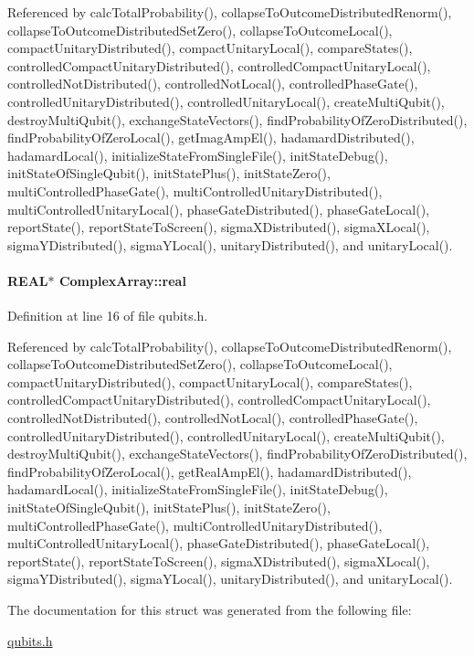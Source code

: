 Referenced by calcTotalProbability(), collapseToOutcomeDistributedRenorm(), collapseToOutcomeDistributedSetZero(), collapseToOutcomeLocal(), compactUnitaryDistributed(), compactUnitaryLocal(), compareStates(), controlledCompactUnitaryDistributed(), controlledCompactUnitaryLocal(), controlledNotDistributed(), controlledNotLocal(), controlledPhaseGate(), controlledUnitaryDistributed(), controlledUnitaryLocal(), createMultiQubit(), destroyMultiQubit(), exchangeStateVectors(), findProbabilityOfZeroDistributed(), findProbabilityOfZeroLocal(), getImagAmpEl(), hadamardDistributed(), hadamardLocal(), initializeStateFromSingleFile(), initStateDebug(), initStateOfSingleQubit(), initStatePlus(), initStateZero(), multiControlledPhaseGate(), multiControlledUnitaryDistributed(), multiControlledUnitaryLocal(), phaseGateDistributed(), phaseGateLocal(), reportState(), reportStateToScreen(), sigmaXDistributed(), sigmaXLocal(), sigmaYDistributed(), sigmaYLocal(), unitaryDistributed(), and unitaryLocal().\hypertarget{structComplexArray_a4195cac6c784ea1b6271f1c7dba1548a}{
\paragraph[{real}]{\setlength{\rightskip}{0pt plus 5cm}REAL$\ast$ {\bf ComplexArray::real}}\hfill}
\label{structComplexArray_a4195cac6c784ea1b6271f1c7dba1548a}


Definition at line 16 of file qubits.h.

Referenced by calcTotalProbability(), collapseToOutcomeDistributedRenorm(), collapseToOutcomeDistributedSetZero(), collapseToOutcomeLocal(), compactUnitaryDistributed(), compactUnitaryLocal(), compareStates(), controlledCompactUnitaryDistributed(), controlledCompactUnitaryLocal(), controlledNotDistributed(), controlledNotLocal(), controlledPhaseGate(), controlledUnitaryDistributed(), controlledUnitaryLocal(), createMultiQubit(), destroyMultiQubit(), exchangeStateVectors(), findProbabilityOfZeroDistributed(), findProbabilityOfZeroLocal(), getRealAmpEl(), hadamardDistributed(), hadamardLocal(), initializeStateFromSingleFile(), initStateDebug(), initStateOfSingleQubit(), initStatePlus(), initStateZero(), multiControlledPhaseGate(), multiControlledUnitaryDistributed(), multiControlledUnitaryLocal(), phaseGateDistributed(), phaseGateLocal(), reportState(), reportStateToScreen(), sigmaXDistributed(), sigmaXLocal(), sigmaYDistributed(), sigmaYLocal(), unitaryDistributed(), and unitaryLocal().

The documentation for this struct was generated from the following file:\begin{DoxyCompactItemize}
\item 
\hyperlink{qubits_8h}{qubits.h}\end{DoxyCompactItemize}
